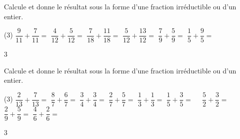 \documentclass[a4paper,11pt]{report}
\begin{document}
\begin{exo}
{Calcule et donne le résultat sous la forme d'une fraction irréductible ou d'un entier. 
\begin{tasks}(3)
\task $\dfrac{9}{11}+\dfrac{7}{11}= $ 
\task $\dfrac{4}{12}+\dfrac{5}{12}=$ 
\task $\dfrac{7}{18}+\dfrac{11}{18}=$
\task $\dfrac{5}{12}+\dfrac{13}{12}=$
\task $\dfrac{7}{9}+\dfrac{5}{9}=$
\task $\dfrac{1}{5}+\dfrac{9}{5}=$
\end{tasks}
}{3}
\end{exo}


\begin{exo}
{Calcule et donne le résultat sous la forme d'une fraction irréductible ou d'un entier. 
\begin{tasks}(3)
\task $\dfrac{2}{13}+\dfrac{7}{13}=$
\task $\dfrac{8}{7}+\dfrac{6}{7}=$
\task $\dfrac{3}{4}+\dfrac{3}{4}=$
\task $\dfrac{2}{7}+\dfrac{5}{7}=$
\task $\dfrac{1}{3}+\dfrac{1}{3}=$
\task $\dfrac{1}{5}+\dfrac{3}{5}=$
\task  $\quad\dfrac{5}{2}+\dfrac{3}{2}=$
\task   $\dfrac{2}{9}+\dfrac{5}{9}=$
\task $\dfrac{4}{6}+\dfrac{2}{6}=$
\end{tasks}
}{3}
\end{exo}
\end{document}
